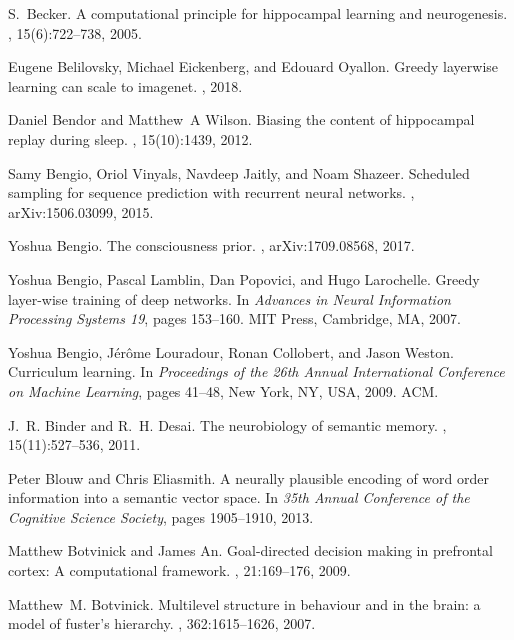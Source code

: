 \documentclass[letterpaper,11pt]{article}
\begin{document}
\begin{thebibliography}{100}
S.~Becker.
\newblock A computational principle for hippocampal learning and neurogenesis.
, 15(6):722--738, 2005.

Eugene Belilovsky, Michael Eickenberg, and Edouard Oyallon.
\newblock Greedy layerwise learning can scale to imagenet.
, 2018.

Daniel Bendor and Matthew~A Wilson.
\newblock Biasing the content of hippocampal replay during sleep.
, 15(10):1439, 2012.

Samy Bengio, Oriol Vinyals, Navdeep Jaitly, and Noam Shazeer.
\newblock Scheduled sampling for sequence prediction with recurrent neural
  networks.
, arXiv:1506.03099, 2015.

Yoshua Bengio.
\newblock The consciousness prior.
, arXiv:1709.08568, 2017.

Yoshua Bengio, Pascal Lamblin, Dan Popovici, and Hugo Larochelle.
\newblock Greedy layer-wise training of deep networks.
\newblock In {\em Advances in Neural Information Processing Systems 19}, pages
  153--160. MIT Press, Cambridge, MA, 2007.

Yoshua Bengio, J{\'e}r\^{o}me Louradour, Ronan Collobert, and Jason Weston.
\newblock Curriculum learning.
\newblock In {\em Proceedings of the 26th Annual International Conference on
  Machine Learning}, pages 41--48, New York, NY, USA, 2009. ACM.

J.~R. Binder and R.~H. Desai.
\newblock The neurobiology of semantic memory.
, 15(11):527--536, 2011.

Peter Blouw and Chris Eliasmith.
\newblock A neurally plausible encoding of word order information into a
  semantic vector space.
\newblock In {\em 35th Annual Conference of the Cognitive Science Society},
  pages 1905--1910, 2013.

Matthew Botvinick and James An.
\newblock Goal-directed decision making in prefrontal cortex: A computational
  framework.
, 21:169--176,
  2009.

Matthew~M. Botvinick.
\newblock Multilevel structure in behaviour and in the brain: a model of
  fuster's hierarchy.
, 362:1615--1626, 2007.


\end{thebibliography}
\end{document}
